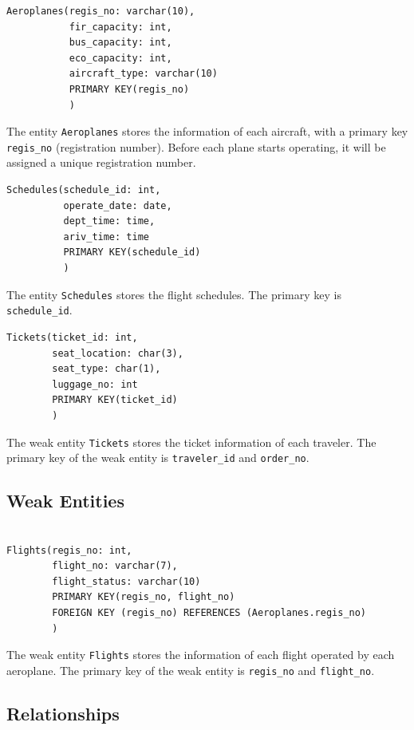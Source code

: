\documentclass{article}
\begin{document}
	\begin{lstlisting}[keepspaces=true]               
Aeroplanes(regis_no: varchar(10),
           fir_capacity: int,
           bus_capacity: int, 
           eco_capacity: int,
           aircraft_type: varchar(10)
           PRIMARY KEY(regis_no)
           )
	\end{lstlisting}    
	The entity \texttt{Aeroplanes} stores the information of each aircraft, with a primary key \texttt{regis\_no} (registration number). Before each plane starts operating, it will be assigned a unique registration number.
	
	\begin{lstlisting}[keepspaces=true] 
Schedules(schedule_id: int, 
          operate_date: date,
          dept_time: time,
          ariv_time: time
          PRIMARY KEY(schedule_id)
          )
	\end{lstlisting}
	The entity \texttt{Schedules} stores the flight schedules. The primary key is \texttt{schedule\_id}.
	
	\begin{lstlisting}[keepspaces=true]
Tickets(ticket_id: int, 
        seat_location: char(3),
        seat_type: char(1),
        luggage_no: int
        PRIMARY KEY(ticket_id)
        )
	\end{lstlisting}    
	The weak entity \texttt{Tickets} stores the ticket information of each traveler. The primary key of the weak entity is \texttt{traveler\_id} and \texttt{order\_no}. 
	
	\subsection{Weak Entities}
	\begin{lstlisting}[keepspaces=true]        
		
Flights(regis_no: int, 
        flight_no: varchar(7),
        flight_status: varchar(10)
        PRIMARY KEY(regis_no, flight_no)
        FOREIGN KEY (regis_no) REFERENCES (Aeroplanes.regis_no)
        )
	\end{lstlisting}
	The weak entity \texttt{Flights} stores the information of each flight operated by each aeroplane. The primary key of the weak entity is \texttt{regis\_no} and \texttt{flight\_no}.

	\subsection{Relationships}
	
\end{document}
